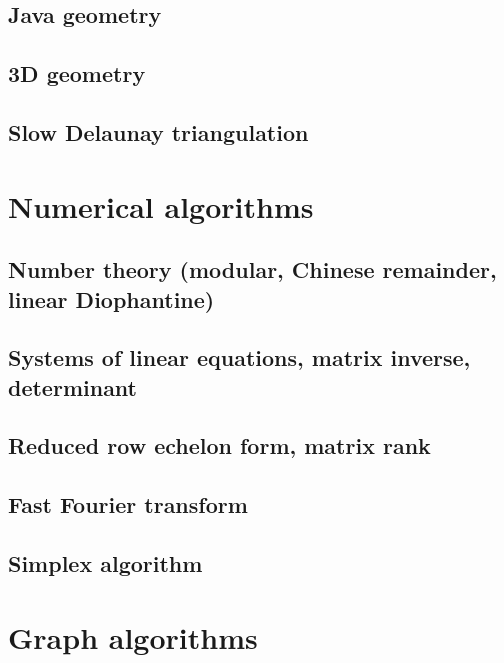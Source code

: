 \subsection{Java geometry}
\raggedbottom
\hrulefill
\subsection{3D geometry}
\raggedbottom
\hrulefill
\subsection{Slow Delaunay triangulation}
\raggedbottom
\hrulefill

\section{Numerical algorithms}
\subsection{Number theory (modular, Chinese remainder, linear Diophantine)}
\raggedbottom
\hrulefill
\subsection{Systems of linear equations, matrix inverse, determinant}
\raggedbottom
\hrulefill
\subsection{Reduced row echelon form, matrix rank}
\raggedbottom
\hrulefill
\subsection{Fast Fourier transform}
\raggedbottom
\hrulefill
\subsection{Simplex algorithm}
\raggedbottom
\hrulefill

\section{Graph algorithms}
